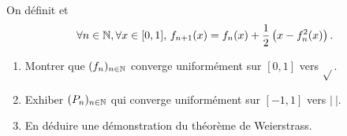 \documentclass[12pt]{article}
\begin{document}
\begin{exercise}
    On définit  et
    \begin{equation*}
        \forall n\in\mathbb{N},\forall x\in[0,1],\,f_{n+1}(x)=f_n(x)+\frac{1}{2}\left(x-f_n^{2}(x)\right).
    \end{equation*}
    \begin{enumerate}
        \item Montrer que $(f_n)_{n\in\mathbb{N}}$ converge uniformément sur $[0,1]$ vers $\sqrt{}$.
        \item Exhiber $(P_n)_{n\in\mathbb{N}}$ qui converge uniformément sur $[-1,1]$ vers $\left\lvert~\right\rvert$.
        \item En déduire une démonstration du théorème de Weierstrass.
    \end{enumerate}
\end{exercise}
\end{document}
